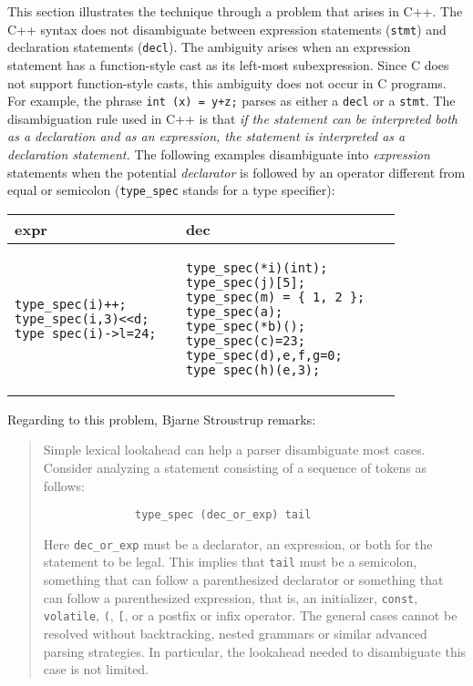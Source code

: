 This section illustrates the technique through a problem 
that arises in C++.
The C++ syntax \cite{c++} does not disambiguate between expression
statements (\verb|stmt|) and declaration statements (\verb|decl|). 
The ambiguity arises when an expression
statement has a function-style cast as its left-most subexpression.
Since C \cite{c} does not support function-style casts, this ambiguity does not occur
in C programs.
For example, the phrase \verb|int (x) = y+z;| 
parses as either a \texttt{decl} or a \texttt{stmt}.
The disambiguation rule used in C++ is that {\it
if the statement can be interpreted both as a declaration and
as an expression, the statement is interpreted as a declaration statement.
}
The following examples  disambiguate into {\it expression} statements when the
potential {\it declarator} is followed by an operator different from equal 
or semicolon (\texttt{type\_spec} stands for a type specifier):

\begin{center}
\begin{tabular}{|p{3.5cm}|p{4.5cm}|}
\hline
expr  & dec\\
\hline
\begin{verbatim}
type_spec(i)++;      
type_spec(i,3)<<d;  
type_spec(i)->l=24;
\end{verbatim}
&
\begin{verbatim}
type_spec(*i)(int); 
type_spec(j)[5];   
type_spec(m) = { 1, 2 }; 
type_spec(a);              
type_spec(*b)();          
type_spec(c)=23;         
type_spec(d),e,f,g=0;   
type_spec(h)(e,3);     
\end{verbatim}\\
\hline
\end{tabular}
\end{center}

Regarding to this problem, Bjarne Stroustrup \cite{stroustrup} remarks:
\begin{quote}
\begin{it}
Simple lexical lookahead can help a parser disambiguate
most cases. Consider analyzing a statement consisting of
a sequence of tokens as follows:
\begin{verbatim}
              type_spec (dec_or_exp) tail
\end{verbatim}
Here \verb|dec_or_exp| must be a declarator, an expression, 
or both for the statement to be legal. This implies that \verb|tail|
must be a semicolon, something that can follow a 
parenthesized declarator or something that can follow
a parenthesized expression, that is, an initializer, \verb|const|,
\verb|volatile|, \verb|(|, \verb|[|, or a postfix or infix operator.
The general cases cannot be resolved without backtracking, nested grammars
or similar advanced parsing strategies. In particular,
the lookahead needed to disambiguate this case is not limited.
\end{it}
\end{quote}

